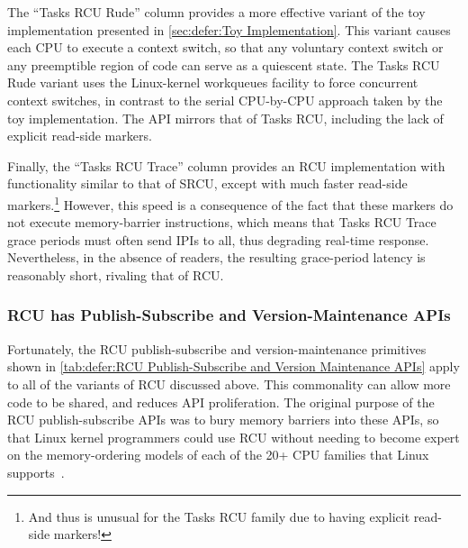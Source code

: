 The ``Tasks RCU Rude'' column provides a more effective variant
of the toy implementation presented in
\cref{sec:defer:Toy Implementation}.
This variant causes each CPU to execute a context switch,
so that any voluntary context switch or any preemptible region of
code can serve as a quiescent state.
The Tasks RCU Rude variant uses the Linux-kernel workqueues facility to
force concurrent context switches, in contrast to the serial
CPU-by-CPU approach taken by the toy implementation.
The API mirrors that of Tasks RCU, including the lack of explicit
read-side markers.

Finally, the ``Tasks RCU Trace'' column provides an RCU implementation
with functionality similar to that of SRCU, except with much faster
read-side markers.\footnote{
	And thus is unusual for the Tasks RCU family due to having
	explicit read-side markers!}
However, this speed is a consequence of the fact that these markers
do not execute memory-barrier instructions, which means that Tasks
RCU Trace grace periods must often send IPIs to all, thus degrading
real-time response.
Nevertheless, in the absence of readers, the resulting grace-period
latency is reasonably short, rivaling that of RCU\@.

\subsubsection{RCU has Publish-Subscribe and Version-Maintenance APIs}
\label{sec:defer:RCU has Publish-Subscribe and Version-Maintenance APIs}

Fortunately, the RCU publish-subscribe and version-maintenance
primitives shown in
\cref{tab:defer:RCU Publish-Subscribe and Version Maintenance APIs}
apply to all of the variants of RCU discussed above.
This commonality can allow more code to be shared, and reduces API
proliferation.
The original purpose of the RCU publish-subscribe APIs was to
bury memory barriers into these APIs, so that Linux kernel
programmers could use RCU without needing to become expert on
the memory-ordering models of each of the 20+ CPU families
that Linux supports~\cite{Spraul01}.

